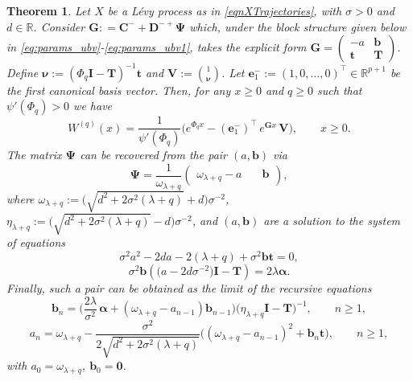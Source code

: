 \documentclass[a4paper,11pt]{article}
\numberwithin{equation}{section}
\theoremstyle{plain}
\newtheorem{theorem}{Theorem}[section]
\theoremstyle{definition}
\newcommand{\1}{\mathbf{1}}
\begin{document}
\begin{theorem}\label{teoScaleFnUV}
Let $X$ be a L\'evy process as in \eqref{eqnXTrajectories}, with $\sigma>0$ and $d\in \mathbb{R}$. 
Consider $\bm{G}: = \bm{C}^- + \bm{D}^{-+}\bm{\Psi}$ which, under the block structure given below in \eqref{eq:params_ubv}-\eqref{eq:params_ubv1}, takes the explicit form $\bm{G} = \begin{pmatrix} -a & \bm{b} \\ \bm{t} & \bm{T} \end{pmatrix}$. Define $\bm{\nu}:=(\Phi_q \bm{I}-\bm{T})^{-1}\bm{t}$ and $\bm{V}:=\binom{1}{\bm{\nu}}$. Let $\bm{e}_1^-:=(1,0,\dots,0)^\intercal\in\mathbb{R}^{p+1}$ be the first canonical basis vector.
Then, for any $x\geq 0$ and $q\geq 0$ such that $\psi'(\Phi_q)>0$ we have
\begin{equation}\label{eq:scale_ubv}
W^{(q)}(x) = \frac{1}{\psi'(\Phi_q)}\Big(e^{\Phi_q x} - (\bm{e}_1^-)^\intercal\,e^{\bm{G}x}\,\bm{V}\Big), \qquad x \ge 0.
\end{equation}
The matrix $\bm{\Psi}$ can be 
recovered from the pair $(a,\bm{b})$ via
\begin{equation}\label{eq:Psi_from_ab}
\bm{\Psi} = \frac{1}{\omega_{\lambda+q}}\begin{pmatrix}\omega_{\lambda+q} - a & \quad \bm{b}\end{pmatrix},
\end{equation}
where $\omega_{\lambda+q} := \big(\sqrt{d^2 + 2\sigma^2 (\lambda+q)} + d\big)\sigma^{-2}$, $\eta_{\lambda+q} := \big(\sqrt{d^2 + 2\sigma^2 (\lambda+q)} - d\big)\sigma^{-2}$, and $(a,\bm b)$ are a solution to the system of equations
\begin{equation}\label{eq:ivanovs_scalar}
\sigma^2a^2-2da-2(\lambda+q)+\sigma^2\bm b\bm t=0,
\end{equation}
\begin{equation}\label{eq:ivanovs_vector}
\sigma^2\bm{b}\left(\big(a-2d\sigma^{-2}\big)\bm I-\bm{T}\right) =2\lambda\bm{\alpha}.
\end{equation}
Finally, such a pair can be obtained as the limit of the recursive equations
\begin{equation}\label{eq:b_recursion}
\bm{b}_n = \Big( \frac{2\lambda}{\sigma^2}\,\bm{\alpha} + (\omega_{\lambda+q}-a_{n-1})\bm{b}_{n-1} \Big) \big(\eta_{\lambda+q}\bm{I} - \bm{T}\big)^{-1}, \qquad n \ge 1,
\end{equation}
\begin{equation}\label{eq:a_recursion}
a_n = \omega_{\lambda+q} - \frac{\sigma^2}{2\sqrt{d^2+2\sigma^2(\lambda+q)}}\Big((\omega_{\lambda+q} - a_{n-1})^2 + \bm{b}_n\bm{t}\Big), \qquad n \ge 1,
\end{equation}
with $a_0=\omega_{\lambda+q}$, $\bm{b}_0=\bm{0}$.
\end{theorem}
\end{document}
